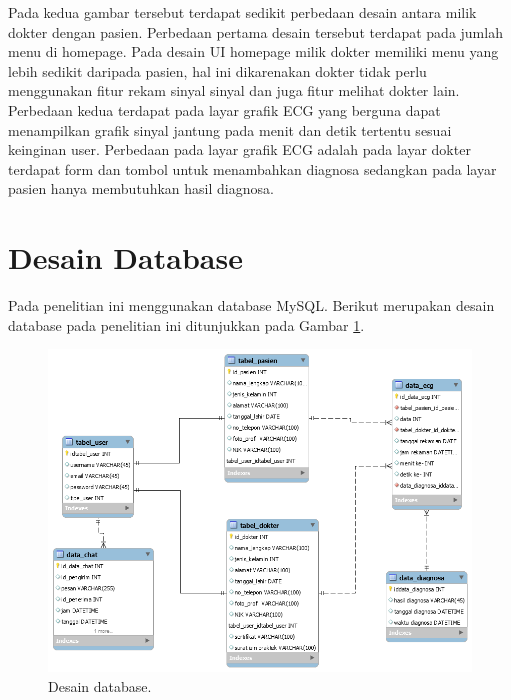 Pada kedua gambar tersebut terdapat
sedikit perbedaan desain antara milik dokter dengan pasien. Perbedaan pertama desain tersebut terdapat pada jumlah menu di homepage. Pada desain UI homepage milik dokter memiliki menu yang lebih sedikit daripada pasien, hal ini dikarenakan dokter tidak perlu menggunakan fitur rekam sinyal sinyal dan juga fitur melihat dokter lain. Perbedaan kedua terdapat
pada layar grafik ECG yang berguna dapat menampilkan grafik sinyal jantung pada menit dan detik tertentu sesuai keinginan user.
Perbedaan pada layar grafik ECG adalah pada layar dokter
terdapat form dan tombol untuk menambahkan diagnosa sedangkan pada layar pasien hanya membutuhkan hasil diagnosa.

\vspace{1ex}

\section{Desain Database}
\vspace{1ex}

Pada penelitian ini menggunakan database MySQL. Berikut merupakan desain database pada penelitian ini ditunjukkan pada Gambar \ref{fig:3.4}. 
\begin{figure}[H] \centering
	\includegraphics[width=1\textwidth]{img/db_revv.png}
	\caption{Desain database.}
	\label{fig:3.4}
\end{figure}
\vspace{1ex}

